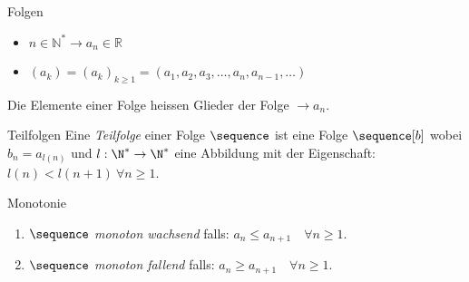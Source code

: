 \begin{definition}{Folgen}
    \begin{itemize}
  \item $n \in \mathbb{N}^{*} \rightarrow a_{n} \in \mathbb{R}$
  \item $\left(a_{k}\right)=\left(a_{k}\right)_{k \geq 1}=\left(a_{1}, a_{2}, a_{3}, \ldots, a_{n}, a_{n-1}, \ldots\right)$
\end{itemize}

Die Elemente einer Folge heissen Glieder der Folge $\rightarrow a_{n}$.
\end{definition}

\begin{definition}{Teilfolgen}
    Eine \emph{Teilfolge} einer Folge $\sequence$ ist eine Folge $\sequence[b]$ wobei $b_n = a_{l(n)}$ und $l: \N^* \to \N^*$ eine Abbildung mit der Eigenschaft: $l(n) < l(n+1)~\forall n \geq 1$.
\end{definition}

\begin{definition}{Monotonie}
    \begin{enumerate}
        \item $\sequence$ \emph{monoton wachsend} falls: \null\hfill $a_n \leq a_{n + 1} \quad \forall n \geq 1$.
    	\item $\sequence$ \emph{monoton fallend} falls: \null\hfill $a_n \geq a_{n+1} \quad \forall n \geq 1$.
    \end{enumerate}
\end{definition}